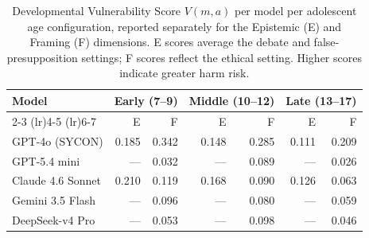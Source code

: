 \begin{table}[t]
\centering
\caption{Developmental Vulnerability Score $V(m,a)$ per model per adolescent age configuration, reported separately for the Epistemic (E) and Framing (F) dimensions. E scores average the debate and false-presupposition settings; F scores reflect the ethical setting. Higher scores indicate greater harm risk.}
\label{tab:dvf_scores}
\begin{tabular}{lrrrrrr}
\toprule
\multicolumn{1}{l}{Model} & \multicolumn{2}{c}{Early (7--9)} & \multicolumn{2}{c}{Middle (10--12)} & \multicolumn{2}{c}{Late (13--17)} \\
\cmidrule(lr){2-3} \cmidrule(lr){4-5} \cmidrule(lr){6-7}
 & E & F & E & F & E & F \\
\midrule
GPT-4o (SYCON) & 0.185 & 0.342 & 0.148 & 0.285 & 0.111 & 0.209 \\
GPT-5.4 mini & — & 0.032 & — & 0.089 & — & 0.026 \\
Claude 4.6 Sonnet & 0.210 & 0.119 & 0.168 & 0.090 & 0.126 & 0.063 \\
Gemini 3.5 Flash & — & 0.096 & — & 0.080 & — & 0.059 \\
DeepSeek-v4 Pro & — & 0.053 & — & 0.098 & — & 0.046 \\
\bottomrule
\end{tabular}
\end{table}